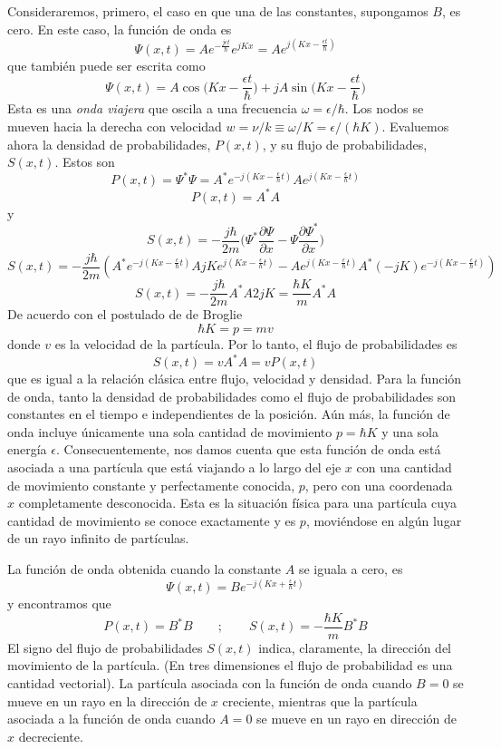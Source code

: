 \documentclass[12pt,a4paper]{article}
\def\e{{\epsilon}} %
\begin{document}
Consideraremos, primero, el caso en que una de las constantes, supongamos $B$, es cero. En este caso, la función de onda es
\[ \Psi (x,t)=Ae^{-\frac{j\e t}{\hbar}} e^{j K x}=Ae^{j(Kx-\frac{\e t}{\hbar})} \]
que también puede ser escrita como
\[ \Psi (x,t)=A \cos \bigg( Kx-\frac{\e t}{\hbar} \bigg) + j A \sin \bigg( Kx-\frac{\e t}{\hbar} \bigg)\]
Esta es una \emph{onda viajera} que oscila a una frecuencia $\omega=\e/\hbar$. Los nodos se mueven hacia la derecha con velocidad $w=\nu/k\equiv \omega/K = \e / (\hbar K)$. Evaluemos ahora la densidad de probabilidades, $P(x,t)$, y su flujo de probabilidades, $S(x,t)$. Estos son
\[ P(x,t)=\Psi^{\ast}\Psi=A^{\ast}e^{-j(Kx-\frac{\e}{\hbar}t)}Ae^{j(Kx-\frac{\e}{\hbar}t)} \]
\[ P(x,t)=A^{\ast}A \]
y
\[ S(x,t)=-\frac{j \hbar}{2m} \bigg( \Psi^{\ast} \frac{\partial \Psi}{\partial x} - \Psi \frac{\partial \Psi^{\ast}}{\partial x} \bigg) \]
\[ S(x,t)=-\frac{j \hbar}{2m} (A^{\ast}e^{-j(Kx-\frac{\e}{\hbar}t)}A j K e ^{j(Kx - \frac{\e}{\hbar}t)}-A e ^{j(Kx - \frac{\e}{\hbar}t)}A^{\ast}(-jK)e^{-j(Kx-\frac{\e}{\hbar}t)}) \]
\[ S(x,t)=-\frac{j \hbar}{2m} A^{\ast}A2jK=\frac{\hbar K}{m}A^{\ast}A \]
De acuerdo con el postulado de de Broglie
\[ \hbar K = p = mv \]
donde $v$ es la velocidad de la partícula. Por lo tanto, el flujo de probabilidades es
\[ S(x,t)=vA^{\ast}A=vP(x,t) \]
que es igual a la relación clásica entre flujo, velocidad y densidad. Para la función de onda, tanto la densidad de probabilidades como el flujo de probabilidades son constantes en el tiempo e independientes de la posición. Aún más, la función de onda incluye únicamente una sola cantidad de movimiento $p=\hbar K$ y una sola energía $\e$. Consecuentemente, nos damos cuenta que esta función de onda está asociada a una partícula que está viajando a lo largo del eje $x$ con una cantidad de movimiento constante y perfectamente conocida, $p$, pero con una coordenada $x$ completamente desconocida. Esta es la situación física para una partícula cuya cantidad de movimiento se conoce exactamente y es $p$, moviéndose en algún lugar de un rayo infinito de partículas.

La función de onda obtenida cuando la constante $A$ se iguala a cero, es
\[ \Psi (x,t)=Be^{-j(Kx+\frac{\e}{\hbar}t)} \]
y encontramos que
\[ P(x,t)=B^{\ast}B \qquad ; \qquad S(x,t)=-\frac{\hbar K}{m} B^{\ast}B \]
El signo del flujo de probabilidades $S(x,t)$ indica, claramente, la dirección del movimiento de la partícula. (En tres dimensiones el flujo de probabilidad es una cantidad vectorial). La partícula asociada con la función de onda cuando $B=0$ se mueve en un rayo en la dirección de $x$ creciente, mientras que la partícula asociada a la función de onda cuando $A=0$ se mueve en un rayo en dirección de $x$ decreciente.
\end{document}
